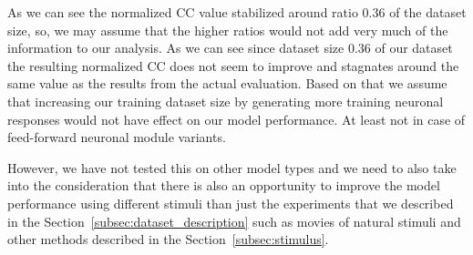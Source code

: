 As we can see the normalized CC value stabilized around ratio 0.36 of the dataset size, so, we may assume that the higher ratios would not add very much of the information to our analysis. As we can see since dataset size 0.36 of our dataset the resulting normalized CC does not seem to improve and stagnates around the same value as the results from the actual evaluation. Based on that we assume that increasing our training dataset size by generating more training neuronal responses would not have effect on our model performance. At least not in case of feed-forward neuronal module variants. 

However, we have not tested this on other model types and we need to also take into the consideration that there is also an opportunity to improve the model performance using different stimuli than just the experiments that we described in the Section~\ref{subsec:dataset_description} such as movies of natural stimuli and other methods described in the Section~\ref{subsec:stimulus}.